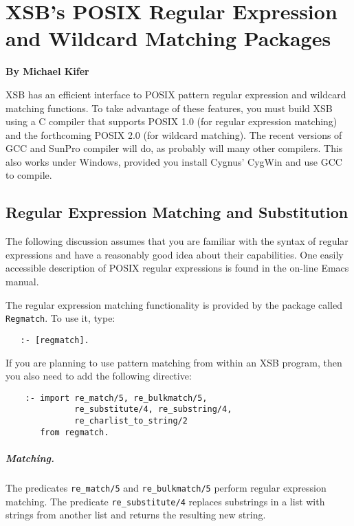 \chapter{XSB's POSIX Regular Expression and Wildcard Matching Packages}

\begin{center}
{\Large {\bf By Michael Kifer}}
\end{center}

XSB has an efficient interface to POSIX pattern regular expression and
wildcard matching functions.  To take advantage of these features, you must
build XSB using a C compiler that supports POSIX 1.0 (for regular
expression matching) and the forthcoming POSIX 2.0 (for wildcard matching).
The recent versions of GCC and SunPro compiler will do, as probably will
many other compilers. This also works under Windows, provided you install
Cygnus' CygWin and use GCC to compile.

\section{Regular Expression Matching and Substitution}

The following discussion assumes that you are familiar with the syntax of
regular expressions and have a reasonably good idea about their
capabilities. One easily accessible description of POSIX regular
expressions is found in the on-line Emacs manual.

The regular expression matching functionality is provided by the package
called {\tt Regmatch}. To use it, type:
\begin{verbatim}
   :- [regmatch].
\end{verbatim}

If you are planning to use pattern matching from within an XSB program,
then you also need to add the following directive:
\begin{verbatim}
    :- import re_match/5, re_bulkmatch/5,
              re_substitute/4, re_substring/4,
              re_charlist_to_string/2
       from regmatch.
\end{verbatim}

\paragraph{Matching.}
The predicates \verb|re_match/5| and \verb|re_bulkmatch/5| perform regular
expression matching.  The predicate \verb|re_substitute/4| replaces
substrings in a list with strings from another list and returns the
resulting new string.

